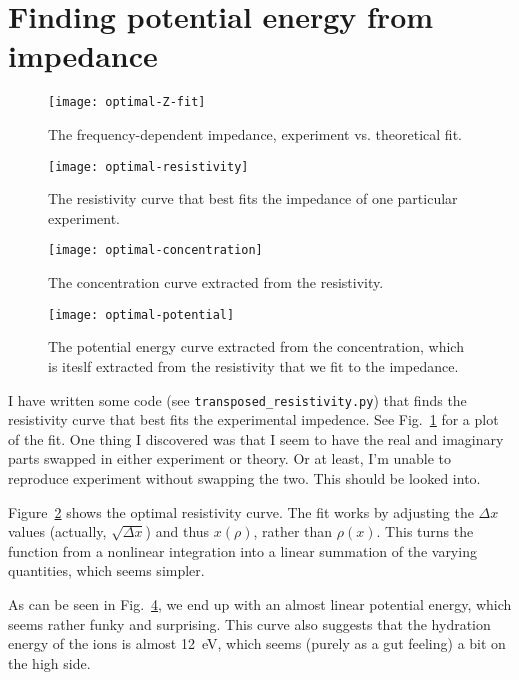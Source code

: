 \documentclass[twocolumn]{article}
\begin{document}
\clearpage

\section{Finding potential energy from impedance}

\begin{figure}
  \texttt{[image: optimal-Z-fit]}
  \caption{The frequency-dependent impedance, experiment
    vs. theoretical fit.}\label{fig:optimal-Z-fit}
\end{figure}

\begin{figure}
  \texttt{[image: optimal-resistivity]}
  \caption{The resistivity curve that best fits the impedance of one
    particular experiment.}\label{fig:optimal-resistivity}
\end{figure}

\begin{figure}
  \texttt{[image: optimal-concentration]}
  \caption{The concentration curve extracted from the
    resistivity.}\label{fig:optimal-concentration}
\end{figure}

\begin{figure}
  \texttt{[image: optimal-potential]}
  \caption{The potential energy curve extracted from the
    concentration, which is iteslf extracted from the resistivity that
    we fit to the impedance.}\label{fig:optimal-potential}
\end{figure}

I have written some code (see \texttt{transposed\_resistivity.py}) that
finds the resistivity curve that best fits the experimental
impedence.  See Fig.~\ref{fig:optimal-Z-fit} for a plot of the fit.
One thing I discovered was that I seem to have the real and imaginary
parts swapped in either experiment or theory.  Or at least, I'm unable
to reproduce experiment without swapping the two.  This should be
looked into.

Figure~\ref{fig:optimal-resistivity} shows the optimal resistivity
curve.  The fit works by adjusting the $\Delta x$ values (actually,
$\sqrt{\Delta x}$) and thus $x(\rho)$, rather than $\rho(x)$.  This
turns the function from a nonlinear integration into a linear
summation of the varying quantities, which seems simpler.

As can be seen in Fig.~\ref{fig:optimal-potential}, we end up with an
almost linear potential energy, which seems rather funky and
surprising.  This curve also suggests that the hydration energy of the
ions is almost 12~eV, which seems (purely as a gut feeling) a bit on
the high side.
\end{document}
